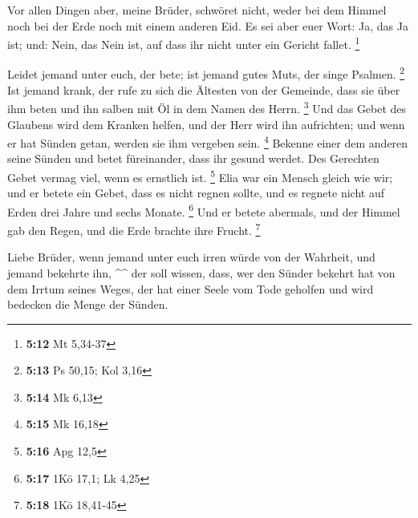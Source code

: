  Vor allen Dingen aber, meine Brüder, schwöret nicht, weder
bei dem Himmel noch bei der Erde noch mit einem anderen Eid. Es sei aber
euer Wort: Ja, das Ja ist; und: Nein, das Nein ist, auf dass ihr nicht
unter ein Gericht fallet. \footnote{\textbf{5:12} Mt 5,34-37}

 Leidet jemand unter euch, der bete; ist jemand gutes Muts,
der singe Psalmen. \footnote{\textbf{5:13} Ps 50,15; Kol 3,16}
 Ist jemand krank, der rufe zu sich die Ältesten von der
Gemeinde, dass sie über ihm beten und ihn salben mit Öl in dem Namen des
Herrn. \footnote{\textbf{5:14} Mk 6,13}  Und das Gebet des
Glaubens wird dem Kranken helfen, und der Herr wird ihn aufrichten; und
wenn er hat Sünden getan, werden sie ihm vergeben sein. \footnote{\textbf{5:15}
  Mk 16,18}  Bekenne einer dem anderen seine Sünden und
betet füreinander, dass ihr gesund werdet. Des Gerechten Gebet vermag
viel, wenn es ernstlich ist. \footnote{\textbf{5:16} Apg 12,5}
 Elia war ein Mensch gleich wie wir; und er betete ein
Gebet, dass es nicht regnen sollte, und es regnete nicht auf Erden drei
Jahre und sechs Monate. \footnote{\textbf{5:17} 1Kö 17,1; Lk 4,25}
 Und er betete abermals, und der Himmel gab den Regen, und
die Erde brachte ihre Frucht. \footnote{\textbf{5:18} 1Kö 18,41-45}

 Liebe Brüder, wenn jemand unter euch irren würde von der
Wahrheit, und jemand bekehrte ihn, \^{}\^{}  der soll
wissen, dass, wer den Sünder bekehrt hat von dem Irrtum seines Weges,
der hat einer Seele vom Tode geholfen und wird bedecken die Menge der
Sünden.

